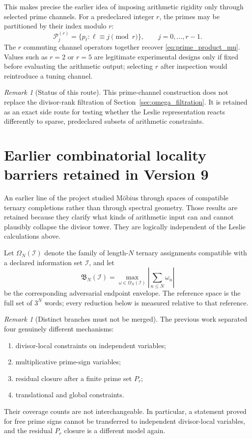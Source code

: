 \documentclass[11pt]{amsart}
\numberwithin{equation}{section}
\theoremstyle{plain}
\theoremstyle{definition}
\theoremstyle{remark}
\newtheorem{remark}[theorem]{Remark}
\begin{document}
This makes precise the earlier idea of imposing arithmetic rigidity only through selected prime
channels.  For a predeclared integer $r$, the primes may be partitioned by their index modulo
$r$:
\[
\mathcal P_j^{(r)}=
\{p_\ell:\ell\equiv j\pmod r\},
\qquad
j=0,\ldots,r-1.
\]
The $r$ commuting channel operators together recover
\eqref{eq:prime_product_mu}.  Values such as $r=2$ or $r=5$ are legitimate experimental
designs only if fixed before evaluating the arithmetic output; selecting $r$ after inspection
would reintroduce a tuning channel.

\begin{remark}[Status of this route]
\label{rem:prime_route_status}
This prime-channel construction does not replace the divisor-rank filtration of
Section~\ref{sec:omega_filtration}.  It is retained as an exact side route for testing whether
the Leslie representation reacts differently to sparse, predeclared subsets of arithmetic
constraints.
\end{remark}




\section{Earlier combinatorial locality barriers retained in Version 9}
\label{sec:v9_locality_barriers}

An earlier line of the project studied M\"obius through spaces of compatible ternary
completions rather than through spectral geometry.  Those results are retained because they
clarify what kinds of arithmetic input can and cannot plausibly collapse the divisor tower.
They are logically independent of the Leslie calculations above.

Let $\Omega_N(\mathcal I)$ denote the family of length-$N$ ternary assignments compatible with
a declared information set $\mathcal I$, and let
\begin{equation}
\mathfrak B_N(\mathcal I)
=
\max_{\omega\in\Omega_N(\mathcal I)}
\left|\sum_{n\le N}\omega_n\right|
\label{eq:v9_adversarial_completion_envelope}
\end{equation}
be the corresponding adversarial endpoint envelope.  The reference space is the full set of
$3^N$ words; every reduction below is measured relative to that reference.

\begin{remark}[Distinct branches must not be merged]
\label{rem:v9_locality_branches_distinct}
The previous work separated four genuinely different mechanisms:
\begin{enumerate}
\item divisor-local constraints on independent variables;
\item multiplicative prime-sign variables;
\item residual closure after a finite prime set $P_r$;
\item translational and global constraints.
\end{enumerate}
Their coverage counts are not interchangeable.  In particular, a statement proved for free
prime signs cannot be transferred to independent divisor-local variables, and the residual
$P_r$ closure is a different model again.
\end{remark}
\end{document}
